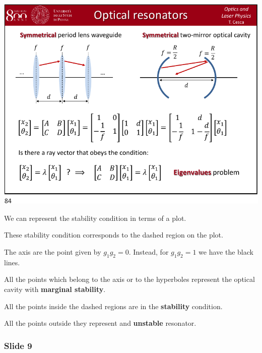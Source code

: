 \documentclass[../main/main.tex]{subfiles}
\begin{document}
\begin{minipage}[]{0.5\linewidth}
\centering
\includegraphics[page=8,width=1\textwidth]{../lessons/pdf_file/21_lecture.pdf}
\end{minipage}
\hspace{0.3cm}\vspace{0.3cm}
\begin{minipage}[c]{0.47\linewidth}

We can represent the stability condition in terms of a plot.

These stability condition corresponds to the dashed region on the plot.

The axis are the point given by \( g_1 g_2 = 0 \). Instead, for \( g_1 g_2 = 1 \) we have the black lines.

All the points which belong to the axis or to the hyperboles represent the optical cavity with \textbf{marginal stability}.

All the points inside the dashed regions are in the \textbf{stability} condition.

All the points outside they represent and \textbf{unstable} resonator.

\end{minipage}

\subsubsection*{Slide 9}
\end{document}
